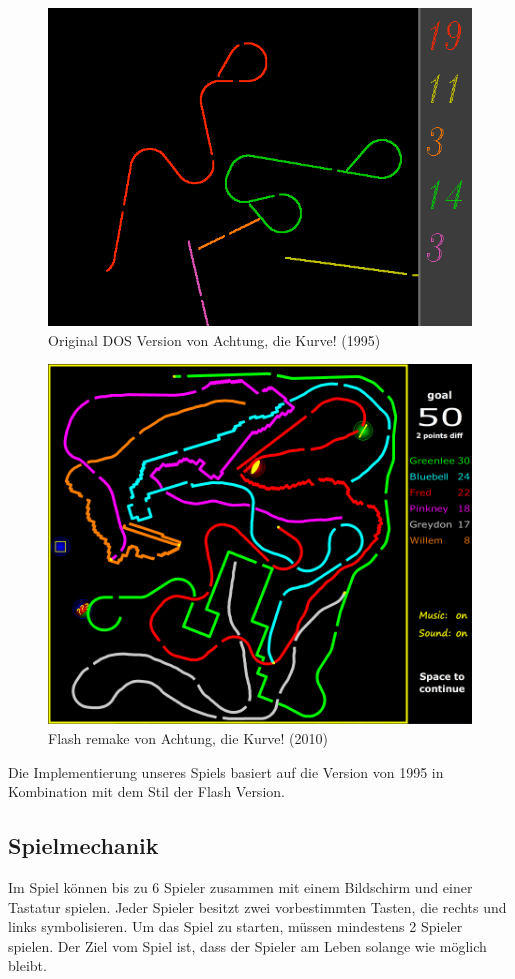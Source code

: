 \documentclass[doktyp=studarbeit]{TUBAFarbeiten}
\begin{document}
\begin{figure}[!h]
	\centering
	\includegraphics[width=0.7\linewidth]{dos-version.png}
	\caption{Original DOS Version von Achtung, die Kurve! (1995)}
	\label{fig:dos-version}
\end{figure}

\begin{figure}[!h]
	\centering
	\includegraphics[width=0.7\linewidth]{flash-version.png}
	\caption{Flash remake von Achtung, die Kurve! (2010)}
	\label{fig:flash-version}
\end{figure}

Die Implementierung unseres Spiels basiert auf die Version von 1995 in 
Kombination mit dem Stil der Flash Version.

\subsection{Spielmechanik}

Im Spiel können bis zu 6 Spieler zusammen mit einem Bildschirm und einer 
Tastatur spielen. Jeder Spieler besitzt zwei vorbestimmten Tasten, die rechts 
und links symbolisieren. Um das Spiel zu starten, müssen mindestens 
2 Spieler spielen.  Der Ziel vom Spiel ist, dass der Spieler am Leben 
solange wie möglich bleibt.
\end{document}
